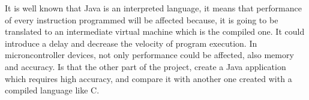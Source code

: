 It is well known that Java is an interpreted language, it means that performance of every instruction programmed will be affected because, it is going to be translated to an intermediate virtual machine which is the compiled one. It could introduce a delay and decrease the velocity of program execution. In microncontroller devices, not only performance could be affected, also memory and accuracy. Is that the other part of the project, create a Java application which requires high accuracy, and compare it with another one created with a compiled language like C.